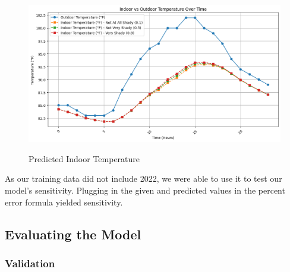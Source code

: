 \documentclass[12pt]{article}
\begin{document}
\begin{figure}
    \centering
    \includegraphics[scale=0.6]{q1.png}
    \label{fig:q1Model}
    \caption{Predicted Indoor Temperature} 
\end{figure}
\par As our training data did not include 2022, we were able to use it to test our model's sensitivity. Plugging in the given and predicted values in the percent error formula yielded sensitivity.
\subsection{Evaluating the Model}
\subsubsection{Validation}
\end{document}
